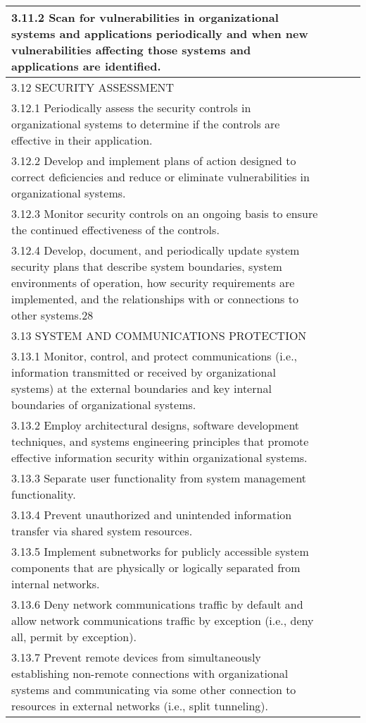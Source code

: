 \begin{longtable} {|p{}|p{}|p{}|p{} |}
{3.11.2 Scan for vulnerabilities in organizational systems and applications periodically and when new vulnerabilities affecting those systems and applications are identified.}&&& \\ \hline
{3.12 SECURITY ASSESSMENT}&&& \\ \hline
{3.12.1 Periodically assess the security controls in organizational systems to determine if the controls are effective in their application.}&&& \\ \hline
{3.12.2 Develop and implement plans of action designed to correct deficiencies and reduce or eliminate vulnerabilities in organizational systems.}&&& \\ \hline
{3.12.3 Monitor security controls on an ongoing basis to ensure the continued effectiveness of the controls.}&&& \\ \hline
{3.12.4 Develop, document, and periodically update system security plans that describe system boundaries, system environments of operation, how security requirements are implemented, and the relationships with or connections to other systems.28}&&& \\ \hline
{3.13 SYSTEM AND COMMUNICATIONS PROTECTION}&&& \\ \hline
{3.13.1 Monitor, control, and protect communications (i.e., information transmitted or received by organizational systems) at the external boundaries and key internal boundaries of organizational systems.}&&& \\ \hline
{3.13.2 Employ architectural designs, software development techniques, and systems engineering principles that promote effective information security within organizational systems.}&&& \\ \hline
{3.13.3 Separate user functionality from system management functionality.}&&& \\ \hline
{3.13.4 Prevent unauthorized and unintended information transfer via shared system resources.}&&& \\ \hline
{3.13.5 Implement subnetworks for publicly accessible system components that are physically or logically separated from internal networks.}&&& \\ \hline
{3.13.6 Deny network communications traffic by default and allow network communications traffic by exception (i.e., deny all, permit by exception).}&&& \\ \hline
{3.13.7 Prevent remote devices from simultaneously establishing non-remote connections with organizational systems and communicating via some other connection to resources in external networks (i.e., split tunneling).}&&& \\ \hline

\end{longtable}
